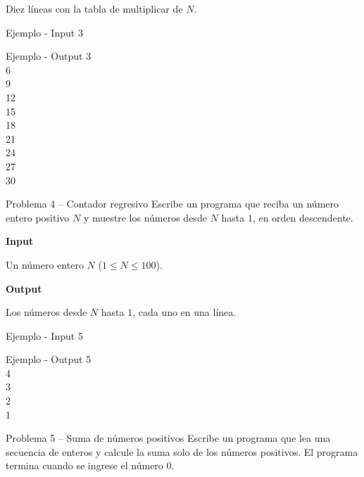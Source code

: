 \documentclass{article}
\begin{document}
Diez líneas con la tabla de multiplicar de $N$.

\vspace{0.5em}

\begin{container}{Ejemplo - Input}
3
\end{container}

\begin{container}{Ejemplo - Output}
3\\
6\\
9\\
12\\
15\\
18\\
21\\
24\\
27\\
30
\end{container}

\vspace{3.5em}


\begin{container}{Problema 4 – Contador regresivo}
Escribe un programa que reciba un número entero positivo $N$ y muestre los números desde $N$ hasta $1$, en orden descendente.
\end{container}

\textbf{Input}

Un número entero $N$ ($1 \leq N \leq 100$).

\vspace{0.5em}
\textbf{Output}

Los números desde $N$ hasta $1$, cada uno en una línea.

\vspace{0.5em}

\begin{container}{Ejemplo - Input}
5
\end{container}

\begin{container}{Ejemplo - Output}
5\\
4\\
3\\
2\\
1
\end{container}

\vspace{3.5em}


\begin{container}{Problema 5 – Suma de números positivos}
Escribe un programa que lea una secuencia de enteros y calcule la suma solo de los números positivos. El programa termina cuando se ingrese el número $0$.
\end{container}
\end{document}
